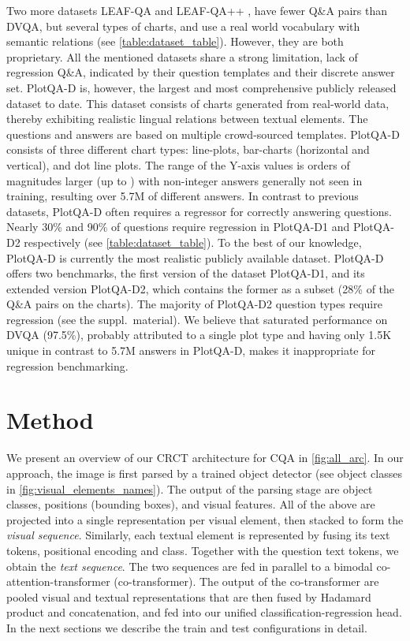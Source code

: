 \documentclass[runningheads]{llncs}
\newcommand\our[1][]{CRCT\xspace}
\begin{document}
Two more datasets LEAF-QA \cite{chaudhry2019leafqa} and LEAF-QA++ \cite{chartqa}, have fewer Q\&A pairs than DVQA, but several types of charts, and use a real world vocabulary with semantic relations (see \cref{table:dataset_table}).
However, they are both proprietary. All the mentioned datasets share a strong limitation, lack of regression Q\&A, indicated by their question templates and their discrete answer set. PlotQA-D \cite{plotqa} is, however, the largest and most comprehensive publicly released dataset to date. This dataset consists of charts generated from real-world data, thereby exhibiting realistic lingual relations between textual elements. The questions and answers are based on multiple crowd-sourced templates. PlotQA-D consists of three different chart types: line-plots, bar-charts (horizontal and vertical), and dot line plots. The range of the Y-axis values is orders of magnitudes larger (up to ) with non-integer answers generally not seen in training, resulting over 5.7M of different answers. In contrast to previous datasets, PlotQA-D often requires a regressor for correctly answering questions. Nearly 30\% and 90\% of questions require regression in PlotQA-D1 and PlotQA-D2 respectively (see \cref{table:dataset_table}). To the best of our knowledge, PlotQA-D is currently the most realistic publicly available dataset.
PlotQA-D offers two benchmarks, the first version of the dataset PlotQA-D1, and its extended version PlotQA-D2, which contains the former as a subset (28\% of the Q\&A pairs on the charts). The majority of PlotQA-D2 question types require regression (see the suppl.~material). We believe that saturated performance on DVQA (97.5\%), probably attributed to a single plot type and having only 1.5K unique in contrast to 5.7M answers in PlotQA-D, makes it inappropriate for regression benchmarking.
%
 \section{Method}We present an overview of our \our architecture for CQA in \cref{fig:all_arc}. In our approach, the image is first parsed by a trained object detector (see object classes in \cref{fig:visual_elements_names}). The output of the parsing stage are object classes, positions (bounding boxes), and visual features. All of the above are projected into a single representation per visual element, then stacked to form the \emph{visual sequence}. Similarly, each textual element is represented by fusing its text tokens, positional encoding and class. Together with the question text tokens, we obtain the \emph{text sequence}.
The two sequences are fed in parallel to a bimodal co-attention-transformer (co-transformer). The output of the co-transformer are pooled visual and textual representations that are then fused by Hadamard product and concatenation, and fed into our unified classification-regression head. In the next sections we describe the train and test configurations in detail.
\end{document}
